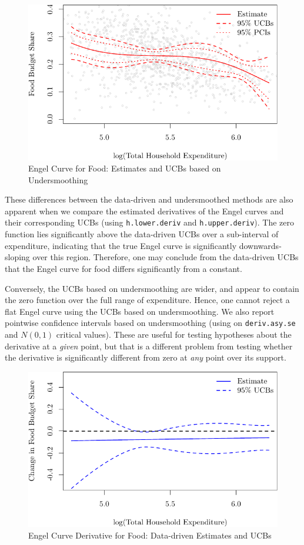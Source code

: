 \documentclass[
]{jss}
\begin{document}
\begin{figure}
\centering
\includegraphics{npiv_files/figure-latex/food-det-1.pdf}
\caption{Engel Curve for Food: Estimates and UCBs based on
Undersmoothing}
\end{figure}

These differences between the data-driven and undersmoothed methods are
also apparent when we compare the estimated derivatives of the Engel
curves and their corresponding UCBs (using \texttt{h.lower.deriv} and
\texttt{h.upper.deriv}). The zero function lies significantly above the
data-driven UCBs over a sub-interval of expenditure, indicating that the
true Engel curve is significantly downwards-sloping over this region.
Therefore, one may conclude from the data-driven UCBs that the Engel
curve for food differs significantly from a constant.

Conversely, the UCBs based on undersmoothing are wider, and appear to
contain the zero function over the full range of expenditure. Hence, one
cannot reject a flat Engel curve using the UCBs based on undersmoothing.
We also report pointwise confidence intervals based on undersmoothing
(using on \texttt{deriv.asy.se} and \(N(0,1)\) critical values). These
are useful for testing hypotheses about the derivative at a \emph{given}
point, but that is a different problem from testing whether the
derivative is significantly different from zero at \emph{any} point over
its support.

\begin{figure}
\centering
\includegraphics{npiv_files/figure-latex/food-dd-deriv-1.pdf}
\caption{Engel Curve Derivative for Food: Data-driven Estimates and
UCBs}
\end{figure}
\end{document}
